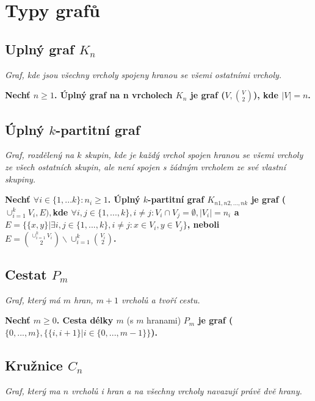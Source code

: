 \documentclass{szzclass}
\begin{document}
\newpage

\section{Typy grafů}
\subsection{Uplný graf $K_n$}
\textit{Graf, kde jsou všechny vrcholy spojeny hranou se všemi ostatními vrcholy.}

\textbf{Nechť $n \geq 1$.\newline
Úplný graf na n vrcholech $K_n$ je graf ($V, \binom{V}{2}$), kde $|V| = n$.}

\subsection{Úplný $k$-partitní graf}
\textit{Graf, rozdělený na $k$ skupin, kde je každý vrchol spojen hranou se všemi vrcholy ze všech ostatních skupin, ale není spojen s žádným vrcholem ze své vlastní skupiny.}

\textbf{Nechť $\forall i ∈ \{1, . . . k\} : n_i \geq 1$.\newline
Úplný $k$-partitní graf $K_{n1,n2,...,nk}$
je graf ($\cup^k _{i=1} V_i, E),$\newline kde $\forall i, j ∈ \{1, . . . , k\}, i \neq j : V_i \cap V_j = ∅, |V_i| = n_i$\newline
a $E = \{\{x, y\} | \exists i, j \in \{1, . . . , k\}, i \neq j : x ∈ V_i, y ∈ V_j\}$,\newline
neboli $E = \binom{ \cup^k_{i=1} V_i}{2} \backslash \cup^k_{i=1} \binom{V_i}{2}$.
}

\subsection{Cestat $P_m$}
\textit{Graf, který má $m$ hran, $m+1$ vrcholů a tvoří cestu.}

\textbf{Nechť $m \geq 0$.\newline
Cesta délky $m$} (s $m$ hranami) \textbf{$P_m$ je graf\newline
($\{0, . . . , m\}, \{\{i, i + 1\} | i \in \{0, . . . ,m-1\}\}$).
}

\subsection{Kružnice $C_n$}
\textit{Graf, který ma $n$ vrcholů i hran a na všechny vrcholy navazují právě dvě hrany.}
\end{document}
